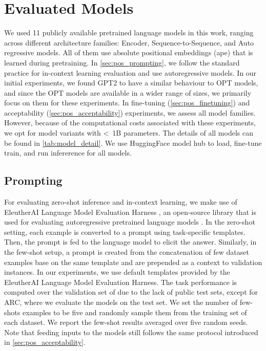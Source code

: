 \documentclass[letterpaper, 12pt]{report}
\begin{document}
\section{Evaluated Models}
\label{sec:pos_evaluated_models}


We used 11 publicly available pretrained language models in this work, ranging across different architecture families: Encoder, Sequence-to-Sequence, and Auto regressive models. All of them use absolute positional embeddings (\acrshort{ape}) that is learned during pretraining. In \autoref{sec:pos_prompting}, we follow the standard practice for in-context learning evaluation \citep{Brown2020:GPT3,Black2022:GPTNeoX, lm-eval-harness} and use autoregressive models. In our initial experiments, we found GPT2 to have a similar behaviour to OPT models, and since the OPT models are available in a wider range of sizes, we primarily focus on them for these experiments.
In fine-tuning (\autoref{sec:pos_finetuning}) and acceptability (\autoref{sec:pos_acceptability}) experiments, we assess all model families. However, because of the computational costs associated with these experiments, we opt for model variants with \textless~1B parameters. The details of all models can be found in \autoref{tab:model_detail}. We use HuggingFace \citep{huggingface} model hub to load, fine-tune train, and run infererence for all models.




\subsection{Prompting}
\label{sec:pos_prompting}
For evaluating zero-shot inference and in-context learning, we make use of EleutherAI Language Model Evaluation Harness \citep{lm-eval-harness}, an open-source library that is used for evaluating autoregressive pretrained language models \citep{Black2022:GPTNeoX}.
In the zero-shot setting, each example is converted to a prompt using task-specific templates. Then, the prompt is fed to the language model to elicit the answer. Similarly, in the few-shot setup, a prompt is created from the concatenation of few dataset examples base on the same template and are prepended as a context to validation instances.
In our experiments, we use default templates provided by the EleutherAI Language Model Evaluation Harness. The task performance is computed over the validation set of due to the lack of public test sets, except for ARC, where we evaluate the models on the test set.
We set the number of few-shots examples to be five and randomly sample them from the training set of each dataset. We report the few-shot results averaged over five random seeds. Note that feeding inputs to the models still follows the same protocol introduced in \autoref{sec:pos_acceptability}.
\end{document}
